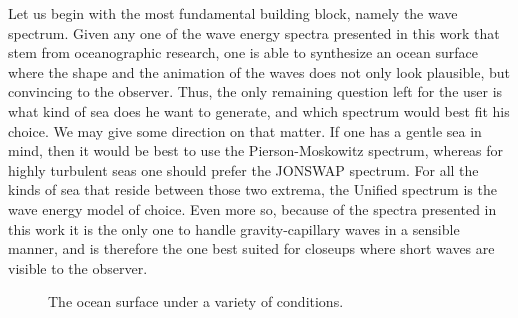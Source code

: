 Let us begin with the most fundamental building block, namely the wave spectrum.
Given any one of the wave energy spectra presented in this work
that stem from oceanographic research, one is able to synthesize an ocean
surface where the shape and the animation of the waves does
not only look plausible, but convincing to the observer.
Thus, the only remaining question left for the user is what
kind of sea does he want to generate, and which spectrum would best
fit his choice. We may give some direction on that matter.
If one has a gentle sea in mind, then it would be best to use the Pierson-Moskowitz spectrum, whereas for highly turbulent seas
one should prefer the JONSWAP spectrum. For all the kinds of sea that reside
between those two extrema, the Unified spectrum is the wave energy model of
choice. Even more so, because of the spectra presented in this work it is the
only one to handle gravity-capillary waves in a sensible manner, and is therefore the one
best suited for closeups where short waves are visible to the observer.
%
%
\begin{figure}
\centering
\caption[Overview of results.]{The ocean surface under a variety of conditions.}
\label{fig:results:overview}
\end{figure}
%
%
